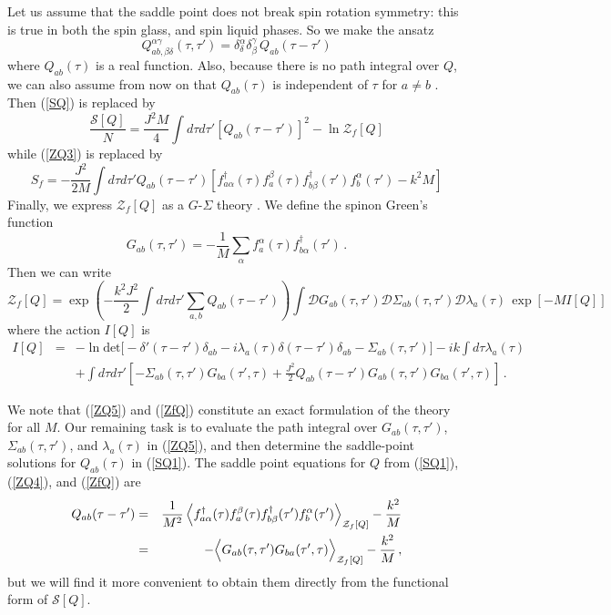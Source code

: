 \documentclass[aps,prx,preprint,onecolumn,citeautoscript,superscriptaddress,nofootinbib,
eqsecnum]{revtex4}
\newcommand{\beq}{\begin{equation}}
\newcommand{\eeq}{\end{equation}}
\def\bea{\begin{eqnarray}}
\def\eea{\end{eqnarray}}
\begin{document}
Let us assume that the saddle point does not break spin rotation symmetry: this is true in both the spin glass, and spin liquid phases. So we make the ansatz \cite{SY92}
\beq
Q_{ab,\beta\delta}^{\alpha\gamma} (\tau, \tau') = \delta^{\alpha}_\delta \delta^\gamma_\beta \, Q_{ab} (\tau- \tau') \label{Qinv}
\eeq	
where $Q_{ab} (\tau)$ is a real function. Also, because there is no path integral over $Q$, we can also assume from now on that $Q_{ab} (\tau)$ is independent of $\tau$ for $a \neq b$ \cite{RSY95}.
Then (\ref{SQ}) is replaced by
\beq
\frac{\mathcal{S}[Q]}{N} =  \frac{J^2 M}{4} \int d \tau d \tau' [Q_{ab}(\tau- \tau')]^2 - \ln \mathcal{Z}_f [Q] \label{SQ1}
\eeq
while (\ref{ZQ3}) is replaced by
\beq
{S}_f = - \frac{J^2}{2M} \int d \tau d \tau' Q_{ab} (\tau-\tau') \left[ f_{a \alpha}^\dagger (\tau) f_a^\beta (\tau) f_{b \beta}^\dagger (\tau') f_b^\alpha (\tau') 
 - k^2 M  \right]\label{ZQ4}
\eeq
Finally, we express $\mathcal{Z}_f[Q]$ as a $G$-$\Sigma$ theory \cite{Maldacena:2016hyu,Kitaev:2017awl}. We define the spinon Green's function
\beq
G_{ab} (\tau, \tau') = - \frac{1}{M} \sum_\alpha f_a^{\alpha} (\tau) f_{b \alpha}^\dagger (\tau') \,.
\eeq
Then we can write
\beq
\mathcal{Z}_{f} [Q] = \exp \left(  - \frac{k^2 J^2}{2}  \int d \tau d \tau' \sum_{a,b} Q_{ab} (\tau-\tau') \right) \int \mathcal{D} G_{ab} (\tau, \tau') \mathcal{D}\Sigma_{ab} (\tau, \tau')  \mathcal{D} \lambda_{a} (\tau) \, \exp \left[ - M I[Q] \right] \label{ZQ5}
\eeq
where the action $I[Q]$ is
\bea
I[Q] &=& -  \ln \mbox{det} 
 \biggl[ - \delta' (\tau - \tau') \delta_{ab} - i \lambda_a (\tau) \delta(\tau - \tau') \delta_{ab}  - \Sigma_{ab} (\tau, \tau') \biggr] - i k \int d \tau \lambda_a (\tau)   \nonumber \\
&~& + \int d \tau d \tau' \left[ - \Sigma_{ab} (\tau, \tau') G_{ba} (\tau', \tau) + \frac{J^2}{2} Q_{ab} (\tau - \tau') G_{ab} (\tau, \tau') G_{ba} (\tau', \tau) \right] \,.  \label{ZfQ}
\eea



We note that (\ref{ZQ5}) and (\ref{ZfQ}) constitute an exact formulation of the theory for all $M$. Our remaining task is to evaluate the path integral over $G_{ab} (\tau, \tau')$, $\Sigma_{ab} (\tau, \tau')$, and $\lambda_a (\tau)$ in (\ref{ZQ5}), and then determine the saddle-point solutions for $Q_{ab} (\tau)$ in (\ref{SQ1}). 
The saddle point equations for $Q$ from (\ref{SQ1}), (\ref{ZQ4}), and (\ref{ZfQ}) are
\bea
Q_{ab} (\tau - \tau') &=& \frac{1}{M^2} \left\langle f_{a \alpha}^\dagger (\tau) f_a^\beta (\tau) f_{b \beta}^\dagger (\tau') f_b^\alpha (\tau') \right\rangle_{\mathcal{Z}_f [Q]} - \frac{k^2}{M} \nonumber \\
&=& - \Bigl\langle G_{ab} (\tau, \tau') G_{ba} (\tau', \tau) \Bigr\rangle_{\mathcal{Z}_f [Q]} - \frac{k^2}{M}\,, \label{ZQ6}
\label{Qf}
\eea
but we will find it more convenient to obtain them directly from the functional form of $\mathcal{S}[Q]$. 
\end{document}
